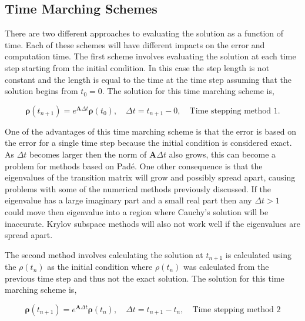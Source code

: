 \subsection{Time Marching Schemes}
\label{sec:timeMarchingSchemes}
There are two different approaches to evaluating the solution as a function of time. Each of these schemes will have different impacts on the error and computation time. The first scheme involves evaluating the solution at each time step starting from the initial condition. In this case the step length is not constant and the length is equal to the time at the time step assuming that the solution begins from $t_{0} = 0$. The solution for this time marching scheme is,

\begin{equation}
    \boldsymbol{\rho}(t_{n+1}) = e^{\boldsymbol{A}\Delta t}\boldsymbol{\rho}(t_{0}), \quad \Delta t = t_{n+1} - 0, \quad \text{Time stepping method 1}.
\end{equation}

\noindent One of the advantages of this time marching scheme is that the error is based on the error for a single time step because the initial condition is considered exact. As $\Delta t$ becomes larger then the norm of $\boldsymbol{A}\Delta t$ also grows, this can become a problem for methods based on Pad\'e. One other consequence is that the eigenvalues of the transition matrix will grow and possibly spread apart, causing problems with some of the numerical methods previously discussed. If the eigenvalue has a large imaginary part and a small real part then any $\Delta t > 1$ could move then eigenvalue into a region where Cauchy's solution will be inaccurate. Krylov subspace methods will also not work well if the eigenvalues are spread apart.

The second method involves calculating the solution at $t_{n+1}$ is calculated using the $\rho(t_{n})$ as the initial condition where $\rho(t_{n})$ was calculated from the previous time step and thus not the exact solution. The solution for this time marching scheme is, 

\begin{equation}
    \boldsymbol{\rho}(t_{n+1}) = e^{\boldsymbol{A}\Delta t}\boldsymbol{\rho}(t_{n}), \quad \Delta t = t_{n+1} - t_{n}, \quad \text{Time stepping method 2}
\end{equation}

